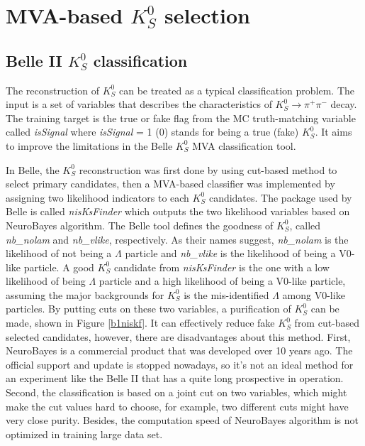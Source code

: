 \begin{comment}
\begin{figure}[htpb]
\centering
\texttt{[image: VXDGEO.png]}
\caption{Geometric structure of PXD and SVD in Belle II\cite{Abe:2010gxa}. SVD Layer 5 is at $r = 11$ cm and $K_S^0$ that decay outside are very likely to lose SVD hits information.}
\label{fig:vxdgeo}
\end{figure}
\end{comment}





\section{MVA-based $K_S^0$ selection}

\subsection{Belle II $K_S^0$ classification}
The reconstruction of $K_S^0$ can be treated as a typical classification problem. The input is a set of variables that describes the characteristics of $K_S^0 \to \pi^+ \pi^-$ decay. The training  target is the true or fake flag from the MC truth-matching variable called \textit{isSignal} where \textit{isSignal} = 1 (0) stands for being a true (fake) $K_S^0$. It aims to improve the limitations in the Belle $K_S^0$ MVA classification tool. 
 
 In Belle, the $K_S^0$ reconstruction was first done by using cut-based method to select primary candidates, then a MVA-based classifier was implemented by assigning two likelihood indicators to each $K_S^0$ candidates. The package used by Belle is called \textit{nisKsFinder}\cite{b2book} which outputs the two likelihood variables based on NeuroBayes algorithm\cite{feindt2006neurobayes}. The Belle tool defines the goodness of $K_S^0$, called \textit{nb\_nolam} and \textit{nb\_vlike}, respectively. As their names suggest, \textit{nb\_nolam} is the likelihood of not being a $\Lambda$ particle and \textit{nb\_vlike} is the likelihood of being a V0-like particle. A good $K_S^0$ candidate from \textit{nisKsFinder} is the one with a low likelihood of being $\Lambda$ particle and a high likelihood of being a V0-like particle, assuming the major backgrounds for $K_S^0$ is the mis-identified $\Lambda$ among V0-like particles. By putting cuts on these two variables, a purification of $K_S^0$ can be made, shown in Figure \ref{b1niskf}. It can effectively reduce fake $K_S^0$ from cut-based selected candidates, however, there are disadvantages about this method. First, NeuroBayes is a commercial product that was developed over 10 years ago. The official support and update is stopped nowadays, so it's not an ideal method for an experiment like the Belle II that has a quite long prospective in operation. Second, the classification is based on a joint cut on two variables, which might make the cut values hard to choose, for example, two different cuts might have very close purity. Besides, the computation speed of NeuroBayes algorithm is not optimized in training large data set.

